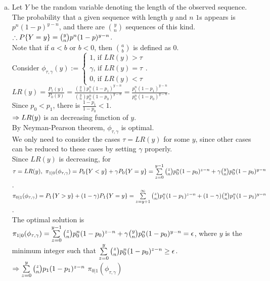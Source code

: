 \begin{pr}
\begin{enumerate}[(a)]
\item Let $Y$ be the random variable denoting the length of the observed sequence. The probability that a given sequence with length $y$ and $n$ $1$s appears is $p^n(1-p)^{y-n}$, and there are $\binom yn$ sequences of this kind.\\
$\therefore P\{Y=y\}=\binom ynp^n(1-p)^{y-n}$.\\
Note that if $a<b$ or $b<0$, then $\binom ab$ is defined as $0$.\\
Consider $\phi_{\tau, \gamma}(y):=\begin{cases}
1\text{, if }LR(y)>\tau\\
\gamma\text{, if }LR(y)=\tau\\
0\text{, if }LR(y)<\tau
\end{cases}$.\\
$LR(y)=\frac{P_1(y)}{P_0(y)}=\frac{\binom ynp_1^n(1-p_1)^{y-n}}{\binom ynp_0^n(1-p_0)^{y-n}}=\frac{p_1^n(1-p_1)^{y-n}}{p_0^n(1-p_0)^{y-n}}$.\\
Since $p_0<p_1$, there is $\frac{1-p_1}{1-p_0}<1$.\\
$\Rightarrow LR(y)$ is an decreasing function of $y$.\\
By Neyman-Pearson theorem, $\phi_{\tau, \gamma}$ is optimal.\\
We only need to consider the cases $\tau=LR(y)$ for some $y$, since other cases can be reduced to these cases by setting $\gamma$ properly.\\
Since $LR(y)$ is decreasing, for $\tau=LR(y),\ \pi_{1|0}(\phi_{\tau, \gamma})=P_0\{Y<y\}+\gamma P_0\{Y=y\}=\suml_{z=0}^{y-1}\binom znp_0^n(1-p_0)^{z-n}+\gamma\binom ynp_0^n(1-p_0)^{y-n}$.\\
$\pi_{0|1}(\phi_{\tau, \gamma})=P_1\{Y>y\}+(1-\gamma)P_1\{Y=y\}=\sum\limits_{z=y+1}^\infty\binom znp_1^n(1-p_1)^{z-n}+(1-\gamma)\binom ynp_1^n(1-p_1)^{y-n}$.\\
The optimal solution is $\pi_{1|0}(\phi_{\tau, \gamma})=\sum\limits_{z=0}^{y-1}\binom znp_0^n(1-p_0)^{z-n}+\gamma\binom ynp_0^n(1-p_0)^{y-n}=\epsilon$, where $y$ is the minimum integer such that $\sum\limits_{z=0}^y\binom znp_0^n(1-p_0)^{z-n}\geq\epsilon$.\\
$\Rightarrow\sum\limits_{z=0}^y\binom znp_1(1-p_1)^{z-n}$
$\pi_{0|1}(\phi_{\tau, \gamma})$
\end{enumerate}
\end{pr}
